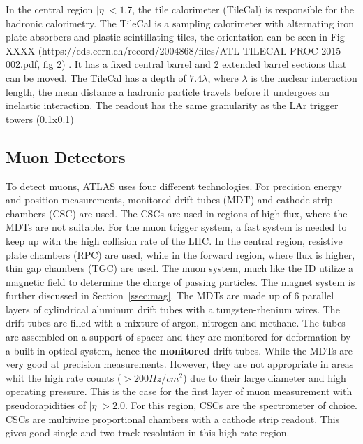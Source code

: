 \indent In the central region ${|\eta{}|<1.7}$, the tile calorimeter (TileCal) is responsible for the hadronic calorimetry. The TileCal is a sampling calorimeter with alternating iron plate absorbers and plastic scintillating tiles, the orientation can be seen in Fig XXXX (https://cds.cern.ch/record/2004868/files/ATL-TILECAL-PROC-2015-002.pdf, fig 2) . It has a fixed central barrel and 2 extended barrel sections that can be moved. The TileCal has a depth of ${7.4\lambda{}}$, where ${\lambda{}}$ is the nuclear interaction length, the mean distance a hadronic particle travels before it undergoes an inelastic interaction. The readout has the same granularity as the LAr trigger towers (0.1x0.1)
\subsection{Muon Detectors}
To detect muons, ATLAS uses four different technologies. For precision energy and position measurements, monitored drift tubes (MDT) and cathode strip chambers (CSC) are used. The CSCs are used in regions of high flux, where the MDTs are not suitable.  For the muon trigger system, a fast system is needed to keep up with the high collision rate of the LHC. In the central region, resistive plate chambers (RPC) are used, while in the forward region, where flux is higher, thin gap chambers (TGC) are used. The muon system, much like the ID utilize a magnetic field to determine the charge of passing particles. The magnet system is further discussed in Section~\ref{ssec:mag}.\linebreak
\indent The MDTs are made up of 6 parallel layers of cylindrical aluminum drift tubes with a tungsten-rhenium wires. The drift tubes are filled with a mixture of argon, nitrogen and methane. The tubes are assembled on a support of spacer and they are monitored for deformation by a built-in optical system, hence the \textbf{monitored} drift tubes. \linebreak
\indent While the MDTs are very good at precision measurements. However, they are not appropriate in areas whit the high rate counts (${> 200 Hz/cm^{2}}$) due to their large diameter and high operating pressure. This is the case for the first layer of muon measurement with pseudorapidities of ${|\eta{}|>2.0}$. For this region, CSCs are the spectrometer of choice. CSCs are multiwire proportional chambers with a cathode strip readout. This gives good single and two track resolution in this high rate region.\linebreak
